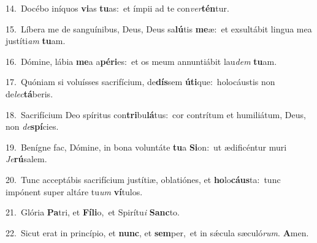 {\numbfont\textcolor{\numbcolor}{14.}}~Docébo iníquos \textbf{vi}\-as \textbf{tu}\-as:~\star et ímpii ad te con\-\textit{ver}\-\textbf{tén}tur.\par
{\numbfont\textcolor{\numbcolor}{15.}}~Líbera me de sanguínibus, Deus, Deus sa\-\textbf{lú}\-tis \textbf{me}\-æ:~\star et exsultábit lingua mea justíti\textit{am} \textbf{tu}\-am.\par
{\numbfont\textcolor{\numbcolor}{16.}}~Dómine, lábia \textbf{me}\-a a\-\textbf{pé}\-\textbf{ri}es:~\star et os meum annuntiábit lau\textit{dem} \textbf{tu}\-am.\par
{\numbfont\textcolor{\numbcolor}{17.}}~Quóniam si voluísses sacrifícium, de\-\textbf{dís}\-sem \textbf{ú}\-\textbf{ti}que:~\star holocáustis non de\-\textit{lec}\-\textbf{tá}beris.\par
{\numbfont\textcolor{\numbcolor}{18.}}~Sacrifícium Deo spíritus con\-\textbf{tri}\-bu\-\textbf{lá}\-tus:~\star cor contrítum et humiliátum, Deus, non \textit{de}\-\textbf{spí}cies.\par
{\numbfont\textcolor{\numbcolor}{19.}}~Benígne fac, Dómine, in bona voluntáte \textbf{tu}\-a \textbf{Si}\-on:~\star ut ædificéntur muri \textit{Je}\-\textbf{rú}salem.\par
{\numbfont\textcolor{\numbcolor}{20.}}~Tunc acceptábis sacrifícium justítiæ, oblatiónes, et \textbf{ho}\-lo\-\textbf{cáus}\-ta:~\star tunc impónent super altáre tu\textit{um} \textbf{ví}\-tulos.\par
{\numbfont\textcolor{\numbcolor}{21.}}~Glória \textbf{Pa}\-tri, et \textbf{Fí}\-\textbf{li}o,~\star et Spirítu\textit{i} \textbf{Sanc}\-to.\par
{\numbfont\textcolor{\numbcolor}{22.}}~Sicut erat in princípio, et \textbf{nunc}\-, et \textbf{sem}\-per,~\star et in sǽcula sæculó\-\textit{rum}\-. \textbf{A}\-men.\par
